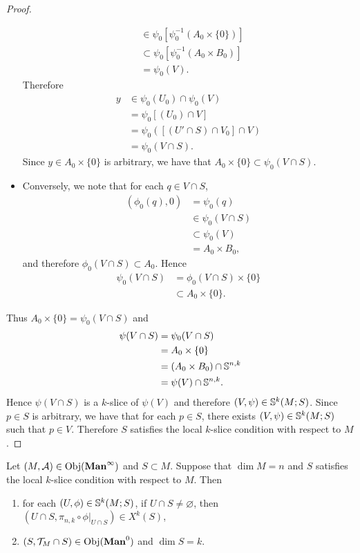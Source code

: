 \documentclass{book}
\begin{document}
\begin{proof}
\begin{itemize}
\begin{align*}
				& \in \psi_0[\psi_0^{-1}(A_0 \times \{0\})] \\
				& \subset \psi_0[\psi_0^{-1}(A_0 \times B_0)] \\
				& = \psi_0(V) .
			\end{align*}
			Therefore 
			\begin{align*}
				y
				& \in \psi_0(U_0) \cap \psi_0(V)  \\
				& = \psi_0[(U_0) \cap V] \\
				& = \psi_0([(U' \cap S) \cap V_0] \cap V) \\
				& = \psi_0(V \cap S).
			\end{align*}
			Since $y \in A_0 \times \{0\}$ is arbitrary, we have that $A_0 \times \{0\} \subset \psi_0(V \cap S)$.  
			\item Conversely, we note that for each $q \in V \cap S$, 
			\begin{align*}
				(\phi_0(q), 0)
				& =  \psi_0(q) \\
				& \in \psi_0(V \cap S) \\
				& \subset \psi_0(V) \\
				& = A_0 \times B_0, 
			\end{align*}
			and therefore $\phi_0(V \cap S) \subset A_0$. Hence 
			\begin{align*}
				\psi_0(V \cap S)
				& = \phi_0(V \cap S) \times \{0\} \\
				& \subset A_0 \times \{0\}.
			\end{align*}
		\end{itemize}
		Thus $A_0 \times \{0\} = \psi_0(V \cap S)$ and 
		\begin{align*}
			\psi(V \cap S)
			& = \psi_0(V \cap S) \\
			& = A_0 \times \{0\} \\
			& = (A_0 \times B_0) \cap \S^{n,k} \\
			& = \psi(V) \cap \S^{n,k}.
		\end{align*}
		Hence $\psi(V \cap S)$ is a $k$-slice of $\psi(V)$ and therefore $(V, \psi) \in \S^k(M; S)$. Since $p \in S$ is arbitrary, we have that for each $p \in S$, there exists $(V, \psi) \in \S^k(M; S)$ such that $p \in V$. Therefore $S$ satisfies the local $k$-slice condition with respect to $M$. 
	\end{proof}

	\begin{ex}
		Let $(M, \MA) \in \Obj(\Maninf)$ and $S \subset M$. Suppose that $\dim M = n$ and $S$ satisfies the local $k$-slice condition with respect to $M$. Then 
		\begin{enumerate}
			\item for each $(U, \phi) \in \S^k(M; S)$, if $U \cap S \neq \varnothing$, then $(U \cap S, \pi_{n, k} \circ \phi|_{U \cap S}) \in X^k(S)$, 
			\item $(S, \MT_M \cap S) \in \Obj(\Man0)$ and $\dim S = k$.
		\end{enumerate}
	\end{ex}
\end{document}
